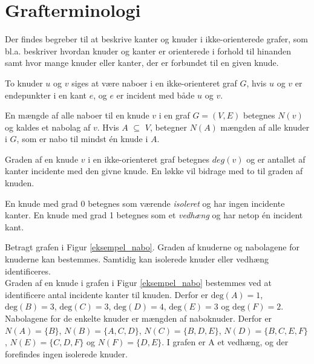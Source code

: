 \usetikzlibrary{arrows, positioning}
\section{Grafterminologi}

Der findes begreber til at beskrive kanter og knuder i ikke-orienterede grafer, som bl.a. beskriver hvordan knuder og kanter er orienterede i forhold til hinanden samt hvor mange knuder eller kanter, der er forbundet til en given knude.

\begin{defn}
To knuder $u$ og $v$ siges at være naboer i en ikke-orienteret graf $G$, hvis $u$ og $v$ er endepunkter i en kant $e$, og $e$ er incident med både $u$ og $v$.
\end{defn}

\begin{defn}
En mængde af alle naboer til en knude $v$ i en graf $G=(V,E)$ betegnes $N(v)$ og kaldes et nabolag af $v$. Hvis $A$ $\subseteq$ $V$, betegner $N(A)$ mængden af alle knuder i $G$, som er nabo til mindst én knude i $A$.
\end{defn}

\begin{defn}
Graden af en knude $v$ i en ikke-orienteret graf betegnes $deg(v)$ og er antallet af kanter incidente med den givne knude.  En løkke vil bidrage med to til graden af knuden. 
\end{defn}

\noindent En knude med grad 0 betegnes som værende \textit{isoleret} og har ingen incidente kanter. En knude med grad 1 betegnes som et \textit{vedhæng} og har netop én incident kant.

\begin{exmp}
Betragt grafen i Figur \ref{eksempel_nabo}. Graden af knuderne og nabolagene for knuderne kan bestemmes. Samtidig kan isolerede knuder eller vedhæng identificeres.\\
Graden af en knude i grafen i Figur \ref{eksempel_nabo} bestemmes ved at identificere antal incidente kanter til knuden. Derfor er $\textrm{deg}(A)=1$, $\textrm{deg}(B)=3$, $\textrm{deg}(C)=3$, $\textrm{deg}(D)=4$, $\textrm{deg}(E)=3$ og $\textrm{deg}(F)=2$. 
Nabolagene for de enkelte knuder er mængden af naboknuder. 
Derfor er $N(A)=\lbrace B \rbrace$, $N(B)=\lbrace A, C, D \rbrace$, $N(C)=\lbrace B, D, E \rbrace$, $N(D)=\lbrace B, C, E, F \rbrace$, $N(E)=\lbrace C, D, F \rbrace$ og $N(F)=\lbrace D, E \rbrace$. 
I grafen er A et vedhæng, og der forefindes ingen isolerede knuder.
\end{exmp}

